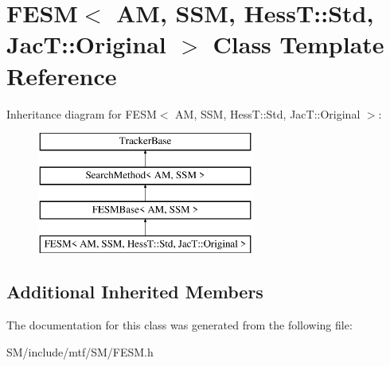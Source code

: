 \hypertarget{classFESM_3_01AM_00_01SSM_00_01HessT_1_1Std_00_01JacT_1_1Original_01_4}{\section{F\-E\-S\-M$<$ A\-M, S\-S\-M, Hess\-T\-:\-:Std, Jac\-T\-:\-:Original $>$ Class Template Reference}
\label{classFESM_3_01AM_00_01SSM_00_01HessT_1_1Std_00_01JacT_1_1Original_01_4}
}
Inheritance diagram for F\-E\-S\-M$<$ A\-M, S\-S\-M, Hess\-T\-:\-:Std, Jac\-T\-:\-:Original $>$\-:\begin{figure}[H]
\begin{center}
\leavevmode
\includegraphics[height=4.000000cm]{classFESM_3_01AM_00_01SSM_00_01HessT_1_1Std_00_01JacT_1_1Original_01_4}
\end{center}
\end{figure}
\subsection*{Additional Inherited Members}


The documentation for this class was generated from the following file\-:\begin{DoxyCompactItemize}
\item 
S\-M/include/mtf/\-S\-M/F\-E\-S\-M.\-h\end{DoxyCompactItemize}
